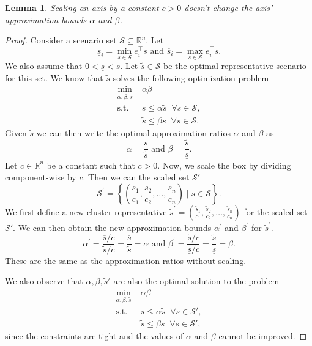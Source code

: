 \documentclass{article}
\newtheorem{lemma}[theorem]{Lemma}
\newcommand{\mS}{\mathcal{S}}
\newcommand{\R}{\mathbb{R}}
\begin{document}
\begin{lemma}
	\label{lemma:scaling_intervals}
	Scaling an axis by a constant $c>0$ doesn't change the axis' approximation bounds $\alpha$ and $\beta$.
\end{lemma}
\begin{proof}%
	Consider a scenario set \(\mS \subseteq \R^n\). 
	Let 
	\[
	\underline{s}_i = \min_{s \in \mS} e_i^{\top}s \text{ and }	\overline{s}_i = \max_{s \in \mS} e_i^{\top}s.
	\]
	We also assume that $0<\underline{s}< \overline{s}$. 
	Let $\tilde{s} \in \mS$ be the optimal representative scenario for this set. 
	We know that \(\tilde{s}\) solves the following optimization problem 
	\begin{equation*}
	\begin{aligned}
		\min_{\alpha, \beta, \tilde{s}} &\; \alpha \beta \\
		\text{s.t.} &\; s \leq \alpha \tilde{s} \;\;\forall s \in \mathcal{S},\\
		&\; \tilde{s} \leq \beta s \;\;\forall s \in \mathcal{S}.
	\end{aligned}
	\end{equation*}
	Given \(\tilde{s}\) we can then write the optimal approximation ratios \(\alpha\) and \(\beta\) as 
	\begin{equation*}
	\alpha = \frac{\overline{s}}{\tilde{s}} \text{ and } \beta=\frac{\tilde{s}}{\underline{s}}.
	\end{equation*}
	Let \(c \in \R^n\) be a constant such that \(c > 0\). 
	Now, we scale the box by dividing component-wise by $c$. Then we can the scaled set \(\mS'\)
	\[
	\mS^\prime = \left\{\left(\frac{s_1}{c_1},\frac{s_2}{c_2},\dots,\frac{s_n}{c_n}\right) \mid s \in \mS\right\}.
	\]
	We first define a new cluster representative $\tilde{s}^\prime = \left(\frac{\tilde{s}_1}{c_1},\frac{\tilde{s}_2}{c_2},\dots,\frac{\tilde{s}_n}{c_n}\right)$ for the scaled set \(\mS'\).
	We can then obtain the new approximation bounds $\alpha^\prime$ and $\beta^\prime$ for \(\tilde{s}^\prime\).
	\begin{equation*}
	\alpha^\prime = \frac{\overline{s}/c}{\tilde{s}/c} = \frac{\overline{s}}{\tilde{s}}=\alpha \text{ and } \beta^\prime = \frac{\tilde{s}/c}{\underline{s}/c} = \frac{\tilde{s}}{\underline{s}} = \beta.
	\end{equation*}
	These are the same as the approximation ratios without scaling.
	
	We also observe that \(\alpha, \beta, \tilde{s}'\) are also the optimal solution to the problem 
	\begin{equation*}
		\begin{aligned}
			\min_{\alpha, \beta, \tilde{s}} &\; \alpha \beta \\
			\text{s.t.} &\; s \leq \alpha \tilde{s} \;\;\forall s \in \mathcal{S}',\\
			&\; \tilde{s} \leq \beta s \;\;\forall s \in \mathcal{S}',
		\end{aligned}
	\end{equation*}
	since the constraints are tight and the values of \(\alpha\) and \(\beta\) cannot be improved.
\end{proof}
\end{document}

